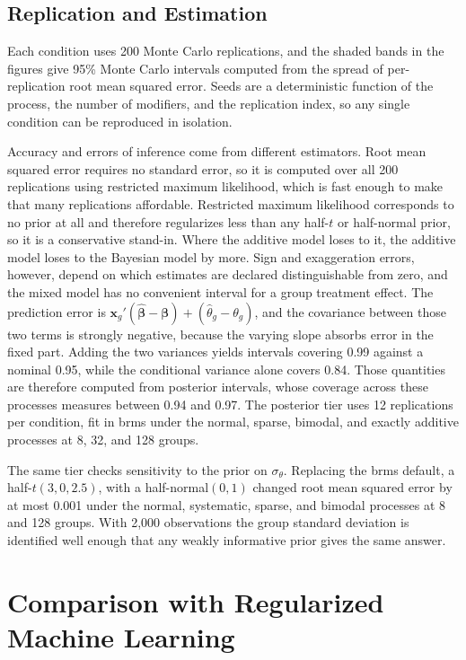 \documentclass[12pt]{article}
\begin{document}
\subsection{Replication and Estimation}

Each condition uses 200 Monte Carlo replications, and the shaded bands in the figures give 95\% Monte Carlo intervals computed from the spread of per-replication root mean squared error.
Seeds are a deterministic function of the process, the number of modifiers, and the replication index, so any single condition can be reproduced in isolation.

Accuracy and errors of inference come from different estimators.
Root mean squared error requires no standard error, so it is computed over all 200 replications using restricted maximum likelihood, which is fast enough to make that many replications affordable.
Restricted maximum likelihood corresponds to no prior at all and therefore regularizes less than any half-$t$ or half-normal prior, so it is a conservative stand-in. Where the additive model loses to it, the additive model loses to the Bayesian model by more.
Sign and exaggeration errors, however, depend on which estimates are declared distinguishable from zero, and the mixed model has no convenient interval for a group treatment effect.
The prediction error is $\mathbf{x}_g'(\hat{\boldsymbol{\beta}} - \boldsymbol{\beta}) + (\hat{\theta}_g - \theta_g)$, and the covariance between those two terms is strongly negative, because the varying slope absorbs error in the fixed part.
Adding the two variances yields intervals covering 0.99 against a nominal 0.95, while the conditional variance alone covers 0.84.
Those quantities are therefore computed from posterior intervals, whose coverage across these processes measures between 0.94 and 0.97.
The posterior tier uses 12 replications per condition, fit in brms under the normal, sparse, bimodal, and exactly additive processes at 8, 32, and 128 groups.

The same tier checks sensitivity to the prior on $\sigma_\theta$.
Replacing the brms default, a half-$t(3, 0, 2.5)$, with a half-normal$(0, 1)$ changed root mean squared error by at most 0.001 under the normal, systematic, sparse, and bimodal processes at 8 and 128 groups.
With 2,000 observations the group standard deviation is identified well enough that any weakly informative prior gives the same answer.

\newpage

\section{Comparison with Regularized Machine Learning}
\end{document}
